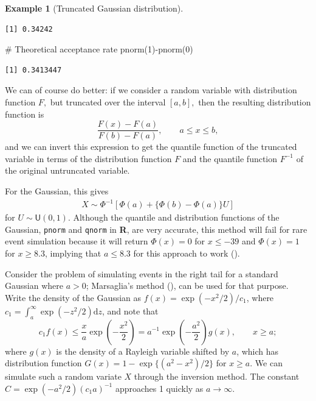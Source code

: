 \documentclass[
  11pt,
  letterpaper,
]{scrbook}
\newenvironment{Shaded}{\begin{snugshade}}{\end{snugshade}}
\newcommand{\CommentTok}[1]{\textcolor[rgb]{0.37,0.37,0.37}{#1}}
\newcommand{\DecValTok}[1]{\textcolor[rgb]{0.68,0.00,0.00}{#1}}
\newcommand{\FunctionTok}[1]{\textcolor[rgb]{0.28,0.35,0.67}{#1}}
\newcommand{\NormalTok}[1]{\textcolor[rgb]{0.00,0.23,0.31}{#1}}
\newcommand{\SpecialCharTok}[1]{\textcolor[rgb]{0.37,0.37,0.37}{#1}}
\theoremstyle{definition}
\theoremstyle{definition}
\newtheorem{example}{Example}[chapter]
\theoremstyle{definition}
\theoremstyle{plain}
\theoremstyle{plain}
\theoremstyle{remark}
\begin{document}
\begin{example}[Truncated Gaussian
distribution]
\begin{verbatim}
[1] 0.34242
\end{verbatim}

\begin{Shaded}
\begin{Highlighting}[]
\CommentTok{\# Theoretical acceptance rate}
\FunctionTok{pnorm}\NormalTok{(}\DecValTok{1}\NormalTok{)}\SpecialCharTok{{-}}\FunctionTok{pnorm}\NormalTok{(}\DecValTok{0}\NormalTok{)}
\end{Highlighting}
\end{Shaded}

\begin{verbatim}
[1] 0.3413447
\end{verbatim}

We can of course do better: if we consider a random variable with
distribution function \(F,\) but truncated over the interval \([a,b],\)
then the resulting distribution function is
\[\frac{F(x) - F(a)}{F(b)-F(a)}, \qquad a \leq x \leq b,\] and we can
invert this expression to get the quantile function of the truncated
variable in terms of the distribution function \(F\) and the quantile
function \(F^{-1}\) of the original untruncated variable.

For the Gaussian, this gives \begin{align*}
X \sim \Phi^{-1}\left[\Phi(a) + \{\Phi(b)-\Phi(a)\}U\right]
\end{align*} for \(U \sim \mathsf{U}(0,1)\). Although the quantile and
distribution functions of the Gaussian, \texttt{pnorm} and
\texttt{qnorm} in \textbf{R}, are very accurate, this method will fail
for rare event simulation because it will return \(\Phi(x) = 0\) for
\(x \leq -39\) and \(\Phi(x)=1\) for \(x \geq 8.3\), implying that
\(a \leq 8.3\) for this approach to work
().

Consider the problem of simulating events in the right tail for a
standard Gaussian where \(a > 0\); Marsaglia's method
(), can be used for that
purpose. Write the density of the Gaussian as
\(f(x) = \exp(-x^2/2)/c_1\), where
\(c_1 = \int_{a}^{\infty}\exp(-z^2/2)\mathrm{d} z\), and note that
\[c_1f(x) \leq \frac{x}{a}\exp\left(-\frac{x^2}{2}\right)= a^{-1}\exp\left(-\frac{a^2}{2}\right)g(x), \qquad x \geq a;\]
where \(g(x)\) is the density of a Rayleigh variable shifted by \(a\),
which has distribution function \(G(x) = 1-\exp\{(a^2-x^2)/2\}\) for
\(x \geq a\). We can simulate such a random variate \(X\) through the
inversion method. The constant \(C= \exp(-a^2/2)(c_1a)^{-1}\) approaches
1 quickly as \(a \to \infty\).


\end{example}
\end{document}
